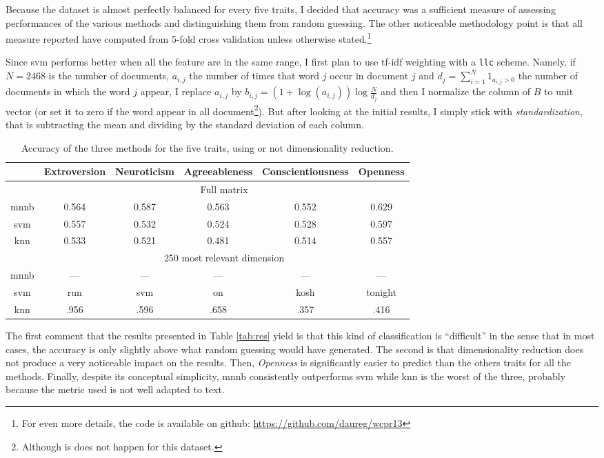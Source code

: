 Because the dataset is almost perfectly balanced for every five traits, I decided that accuracy was a sufficient measure of assessing performances of the various methods and distinguishing them from random guessing. The other noticeable methodology point is that all measure reported have computed from 5-fold cross validation unless otherwise stated.\footnote{For even more details, the code is available on github: \href{https://github.com/daureg/wcpr13}{https://github.com/daureg/wcpr13}}

Since \gls{svm} performs better when all the feature are in the same range, I first plan to use tf-idf weighting with a \texttt{llc} scheme. Namely, if $N=2468$ is the number of documents, $a_{i,j}$ the number of times that word $j$ occur in document $j$ and $d_j = \sum_{i=1}^N 1_{a_{i,j}>0}$ the number of documents in which the word $j$ appear, I replace $a_{i,j}$ by $b_{i,j} = (1+\log(a_{i,j}))\log\frac{N}{d_j}$ and then I normalize the column of $B$ to unit vector (or set it to zero if the word appear in all document\footnote{Although is does not happen for this dataset.}). But after looking at the initial results, I simply stick with \emph{standardization}, that is subtracting the mean and dividing by the standard deviation of each column.

\begin{table}[hb]
	\centering
	\begin{tabular}{cccccc}
		\toprule
		& Extroversion & Neuroticism & Agreeableness & Conscientiousness & Openness \tabularnewline
		\midrule
		& \multicolumn{5}{c}{Full matrix} \tabularnewline
		\cmidrule(r){2-6}
		\gls{mnnb} & 0.564 & 0.587 & 0.563 & 0.552 & 0.629 \tabularnewline
   		\gls{svm} & 0.557 & 0.532 & 0.524 & 0.528 & 0.597 \tabularnewline
   		\gls{knn} & 0.533 & 0.521 & 0.481 & 0.514 & 0.557 \tabularnewline
		& \multicolumn{5}{c}{250 most relevant dimension} \tabularnewline
		\cmidrule(r){2-6}
		\gls{mnnb} & --- & --- & --- & --- & --- \tabularnewline
   		\gls{svm} & run & svm & on & kosh & tonight \tabularnewline
   		\gls{knn} & .956 & .596 & .658 & .357 & .416 \tabularnewline
		\bottomrule
	\end{tabular}
	\caption{Accuracy of the three methods for the five traits, using or not dimensionality reduction.}
	\label{tab:res}
\end{table}

The first comment that the results presented in Table \vref{tab:res} yield is that this kind of classification is \enquote{difficult} in the sense that in most cases, the accuracy is only slightly above what random guessing would have generated. The second is that dimensionality reduction does not produce a very noticeable impact on the results. Then, \emph{Openness} is significantly easier to predict than the others traits for all the methods. Finally, despite its conceptual simplicity, \gls{mnnb} consistently outperforms \gls{svm} while \gls{knn} is the worst of the three, probably because the metric used is not well adapted to text.

